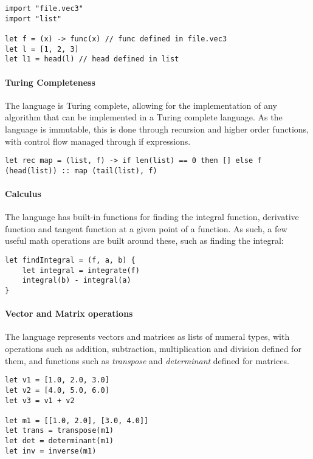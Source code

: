 \begin{verbatim}
import "file.vec3"
import "list"

let f = (x) -> func(x) // func defined in file.vec3
let l = [1, 2, 3]
let l1 = head(l) // head defined in list
\end{verbatim}

\paragraph{Turing Completeness} The language is Turing complete, allowing for the implementation of any
algorithm that can be implemented in a Turing complete language.
As the language is immutable, this is done through recursion and higher order functions, with control flow
managed through if expressions.

\begin{verbatim}
let rec map = (list, f) -> if len(list) == 0 then [] else f (head(list)) :: map (tail(list), f)
\end{verbatim}

\paragraph{Calculus} The language has built-in functions for finding the integral function, derivative function
and tangent function at a given point of a function.
As such, a few useful math operations are built around these, such as finding the integral:

\begin{verbatim}
let findIntegral = (f, a, b) {
    let integral = integrate(f)
    integral(b) - integral(a)
}
\end{verbatim}

\paragraph{Vector and Matrix operations} The language represents vectors and matrices as lists of numeral types, with
operations such as addition, subtraction, multiplication and division defined for them, and functions such as \textit{transpose} and \textit{determinant} defined for matrices.

\begin{verbatim}
let v1 = [1.0, 2.0, 3.0]
let v2 = [4.0, 5.0, 6.0]
let v3 = v1 + v2

let m1 = [[1.0, 2.0], [3.0, 4.0]]
let trans = transpose(m1)
let det = determinant(m1)
let inv = inverse(m1)
\end{verbatim}


